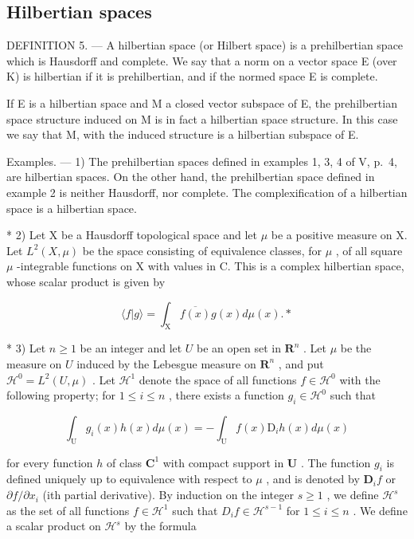 \subsection{Hilbertian spaces}

DEFINITION 5. --- A hilbertian space (or Hilbert space) is a prehilbertian space which is Hausdorff and complete. We say that a norm on a vector space E (over K) is hilbertian if it is prehilbertian, and if the normed space E is complete.

If E is a hilbertian space and M a closed vector subspace of E, the prehilbertian space structure induced on M is in fact a hilbertian space structure. In this case we say that M, with the induced structure is a hilbertian subspace of E.

Examples. --- 1) The prehilbertian spaces defined in examples 1, 3, 4 of V, p.~4, are hilbertian spaces. On the other hand, the prehilbertian space defined in example 2 is neither Hausdorff, nor complete. The complexification of a hilbertian space is a hilbertian space.

* 2) Let X be a Hausdorff topological space and let \(\mu\) be a positive measure on X. Let \(L^2(X, \mu)\) be the space consisting of equivalence classes, for \(\mu\) , of all square \(\mu\) -integrable functions on X with values in C. This is a complex hilbertian space, whose scalar product is given by

\[
\langle f | g \rangle = \int_ {\mathrm{X}} \overline {{{f (x)}}} g (x) d \mu (x). *
\]

* 3) Let \(n \geqslant 1\) be an integer and let \(U\) be an open set in \(\mathbf{R}^n\) . Let \(\mu\) be the measure on \(U\) induced by the Lebesgue measure on \(\mathbf{R}^n\) , and put \(\mathcal{H}^0 = L^2(U, \mu)\) . Let \(\mathcal{H}^1\) denote the space of all functions \(f \in \mathcal{H}^0\) with the following property; for \(1 \leqslant i \leqslant n\) , there exists a function \(g_i \in \mathcal{H}^0\) such that

\[
\int_ {\mathrm{U}} g _ {i} (x) h (x) d \mu (x) = - \int_ {\mathrm{U}} f (x) \mathrm{D} _ {i} h (x) d \mu (x)
\]

for every function \(h\) of class \(\mathbf{C}^1\) with compact support in \(\mathbf{U}\) . The function \(g_i\) is defined uniquely up to equivalence with respect to \(\mu\) , and is denoted by \(\mathbf{D}_i f\) or \(\partial f / \partial x_i\) (ith partial derivative). By induction on the integer \(s \geqslant 1\) , we define \(\mathcal{H}^s\) as the set of all functions \(f \in \mathcal{H}^1\) such that \(D_i f \in \mathcal{H}^{s-1}\) for \(1 \leqslant i \leqslant n\) . We define a scalar product on \(\mathcal{H}^s\) by the formula

